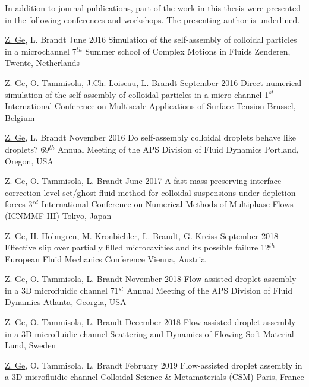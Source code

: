 \begin{conferences}
        In addition to journal publications, part of the work in this thesis were
        presented in the following conferences and workshops. The presenting author is underlined.

        \bigskip

  \conferenceitem%
    {\underline{Z. Ge}, L. Brandt}%
    {June 2016}%
    {Simulation of the self-assembly of colloidal particles in a microchannel}%
    {7$^{th}$ Summer school of Complex Motions in Fluids}%
    {Zenderen, Twente, Netherlands}%

  \conferenceitem%
    {Z. Ge, \underline{O. Tammisola}, J.Ch. Loiseau, L. Brandt}%
    {September 2016}%
    {Direct numerical simulation of the self-assembly of colloidal particles in a micro-channel}%
    {1$^{st}$ International Conference on Multiscale Applications of Surface Tension}%
    {Brussel, Belgium}%

  \conferenceitem%
    {\underline{Z. Ge}, L. Brandt}%
    {November 2016}%
    {Do self-assembly colloidal droplets behave like droplets?}%
    {69$^{th}$ Annual Meeting of the APS Division of Fluid Dynamics}%
    {Portland, Oregon, USA}%

  \conferenceitem%
    {\underline{Z. Ge}, O. Tammisola, L. Brandt}%
    {June 2017}%
    {A fast mass-preserving interface-correction level set/ghost fluid method for colloidal suspensions under depletion forces}%
    {3$^{rd}$ International Conference on Numerical Methods of Multiphase Flows (ICNMMF-III)}%
    {Tokyo, Japan}%

  \conferenceitem%
    {\underline{Z. Ge}, H. Holmgren, M. Kronbichler, L. Brandt, G. Kreiss}%
    {September 2018}%
    {Effective slip over partially filled microcavities and its possible failure}%
    {12$^{th}$ European Fluid Mechanics Conference}%
    {Vienna, Austria}%

  \conferenceitem%
    {\underline{Z. Ge}, O. Tammisola, L. Brandt}%
    {November 2018}%
    {Flow-assisted droplet assembly in a 3D microfluidic channel}%
    {71$^{st}$ Annual Meeting of the APS Division of Fluid Dynamics}%
    {Atlanta, Georgia, USA}%

  \conferenceitem%
    {\underline{Z. Ge}, O. Tammisola, L. Brandt}%
    {December 2018}%
    {Flow-assisted droplet assembly in a 3D microfluidic channel}%
    {Scattering and Dynamics of Flowing Soft Material}%
    {Lund, Sweden}%

  \conferenceitem%
    {\underline{Z. Ge}, O. Tammisola, L. Brandt}%
    {February 2019}%
    {Flow-assisted droplet assembly in a 3D microfluidic channel}%
    {Colloidal Science \& Metamaterials (CSM)}%
    {Paris, France}%

\end{conferences}


%
\tableofcontents
